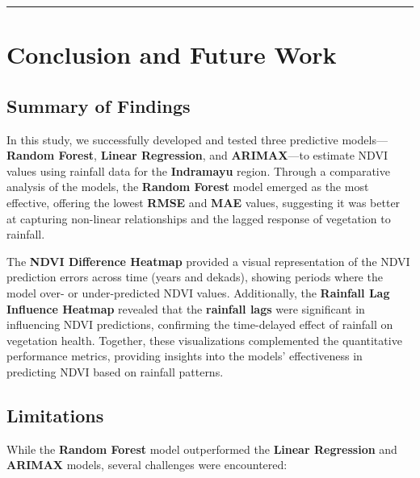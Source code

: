 \documentclass[
]{article}
\begin{document}
\begin{center}\rule{0.5\linewidth}{0.5pt}\end{center}

\section{Conclusion and Future Work}\label{conclusion-and-future-work}

\subsection{Summary of Findings}\label{summary-of-findings}

In this study, we successfully developed and tested three predictive
models--- \textbf{Random Forest}, \textbf{Linear Regression}, and
\textbf{ARIMAX}---to estimate NDVI values using rainfall data for the
\textbf{Indramayu} region. Through a comparative analysis of the models,
the \textbf{Random Forest} model emerged as the most effective, offering
the lowest \textbf{RMSE} and \textbf{MAE} values, suggesting it was
better at capturing non-linear relationships and the lagged response of
vegetation to rainfall.

The \textbf{NDVI Difference Heatmap} provided a visual representation of
the NDVI prediction errors across time (years and dekads), showing
periods where the model over- or under-predicted NDVI values.
Additionally, the \textbf{Rainfall Lag Influence Heatmap} revealed that
the \textbf{rainfall lags} were significant in influencing NDVI
predictions, confirming the time-delayed effect of rainfall on
vegetation health. Together, these visualizations complemented the
quantitative performance metrics, providing insights into the models'
effectiveness in predicting NDVI based on rainfall patterns.

\subsection{Limitations}\label{limitations}

While the \textbf{Random Forest} model outperformed the \textbf{Linear
Regression} and \textbf{ARIMAX} models, several challenges were
encountered:
\end{document}
